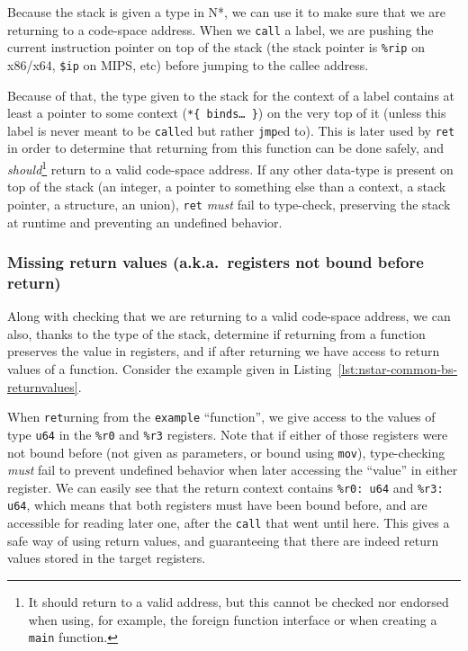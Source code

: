Because the stack is given a type in N*, we can use it to make sure that we are returning to a code-space address.
When we \texttt{call} a label, we are pushing the current instruction pointer on top of the stack (the stack pointer is \texttt{\%rip} on x86/x64, \texttt{\$ip} on MIPS, etc) before jumping to the callee address.

Because of that, the type given to the stack for the context of a label contains at least a pointer to some context (\texttt{*\{ binds\ldots\ \}}) on the very top of it (unless this label is never meant to be \texttt{call}ed but rather \texttt{jmp}ed to).
This is later used by \texttt{ret} in order to determine that returning from this function can be done safely, and \textit{should}\footnote{It should return to a valid address, but this cannot be checked nor endorsed when using, for example, the foreign function interface or when creating a \texttt{main} function.} return to a valid code-space address.
If any other data-type is present on top of the stack (an integer, a pointer to something else than a context, a stack pointer, a structure, an union), \texttt{ret} \textit{must} fail to type-check, preserving the stack at runtime and preventing an undefined behavior.

\subsubsection{Missing return values (a.k.a.\ registers not bound before return)}\label{subsubsec:nstar-common-bs-restrictions-unboundregs}

Along with checking that we are returning to a valid code-space address, we can also, thanks to the type of the stack, determine if returning from a function preserves the value in registers, and if after returning we have access to return values of a function.
Consider the example given in Listing~\ref{lst:nstar-common-bs-returnvalues}.

When \texttt{ret}urning from the \texttt{example} ``function'', we give access to the values of type \texttt{u64} in the \texttt{\%r0} and \texttt{\%r3} registers.
Note that if either of those registers were not bound before (not given as parameters, or bound using \texttt{mov}), type-checking \textit{must} fail to prevent undefined behavior when later accessing the ``value'' in either register.
We can easily see that the return context contains \texttt{\%r0: u64} and \texttt{\%r3: u64}, which means that both registers must have been bound before, and are accessible for reading later one, after the \texttt{call} that went until here.
This gives a safe way of using return values, and guaranteeing that there are indeed return values stored in the target registers.

